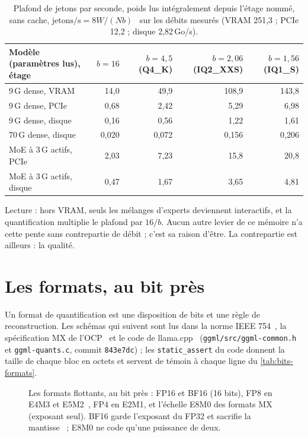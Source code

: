 \begin{table}[ht]
\centering\small
\caption[Plafonds selon le nombre de bits par poids]{Plafond de jetons par seconde, poids lus intégralement depuis l'étage nommé, sans cache, $\text{jetons/s} = 8W/(Nb)$ \calc~sur les débits mesurés (VRAM 251,3 ; PCIe 12,2 ; disque 2,82\,Go/s).}
\label{tab:quant-plafonds}
\begin{tabular}{@{}lrrrr@{}}
\toprule
Modèle (paramètres lus), étage & $b=16$ & $b=4{,}5$ (Q4\_K) & $b=2{,}06$ (IQ2\_XXS) & $b=1{,}56$ (IQ1\_S) \\
\midrule
9\,G dense, VRAM & 14,0 & 49,9 & 108,9 & 143,8 \\
9\,G dense, PCIe & 0,68 & 2,42 & 5,29 & 6,98 \\
9\,G dense, disque & 0,16 & 0,56 & 1,22 & 1,61 \\
70\,G dense, disque & 0,020 & 0,072 & 0,156 & 0,206 \\
MoE à 3\,G actifs, PCIe & 2,03 & 7,23 & 15,8 & 20,8 \\
MoE à 3\,G actifs, disque & 0,47 & 1,67 & 3,65 & 4,81 \\
\bottomrule
\end{tabular}
\end{table}

Lecture : hors VRAM, seuls les mélanges d'experts deviennent interactifs, et la quantification multiplie le plafond par $16/b$. Aucun autre levier de ce mémoire n'a cette pente sans contrepartie de débit ; c'est sa raison d'être. La contrepartie est ailleurs : la qualité.

\section{Les formats, au bit près}\label{sec:formats}

Un format de quantification est une disposition de bits et une règle de reconstruction. Les schémas qui suivent sont lus dans la norme IEEE 754~\cite{ieee754}, la spécification MX de l'OCP~\cite{ocpmx2023,mx2023} et le code de llama.cpp~\cite{llamacpp} (\texttt{ggml/src/ggml-common.h} et \texttt{ggml-quants.c}, commit \texttt{843e7dc}) ; les \texttt{static\_assert} du code donnent la taille de chaque bloc en octets et servent de témoin à chaque ligne du \cref{tab:bits-formats}.

\begin{figure}[ht]
\centering
\SchemaFlottants
\caption[Les formats flottants, au bit près]{Les formats flottants, au bit près : FP16 et BF16 (16 bits), FP8 en E4M3 et E5M2~\cite{micikevicius2022fp8}, FP4 en E2M1, et l'échelle E8M0 des formats MX (exposant seul). BF16 garde l'exposant du FP32 et sacrifie la mantisse~\cite{kalamkar2019bf16} ; E8M0 ne code qu'une puissance de deux.}
\label{fig:flottants}
\end{figure}

